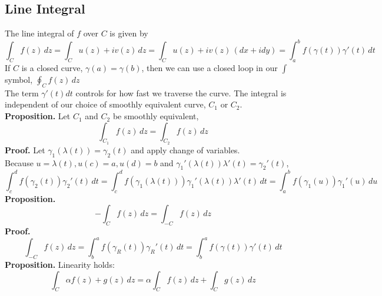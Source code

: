 \documentclass[11pt]{article}
\begin{document}
\subsection{Line Integral}
The line integral of $f$ over $C$ is given by 
$$\int_C f(z) \,dz = \int_C u(z) + iv(z) \,dz = \int_C u(z) + iv(z) \,{(dx + idy)} = \int_{a}^{b} f(\gamma(t))\gamma'(t) \,dt$$
If $C$ is a closed curve, $\gamma(a) = \gamma(b)$, then we can use a closed loop in our $\int$ symbol, $\oint_C f(z) \,dz$ \\
The term $\gamma'(t)dt$ controls for how fast we traverse the curve. The integral is independent of our choice of smoothly equivalent curve, $C_1$ or $C_2$. \\
\newline
\textbf{Proposition.} Let $C_1$ and $C_2$ be smoothly equivalent, \\
$$\int_{C_1} f(z) \,dz = \int_{C_2} f(z) \,dz$$
\textbf{Proof.} Let $\gamma_1(\lambda(t)) = \gamma_2(t)$ and apply change of variables. \\
Because $u = \lambda(t), u(c) = a, u(d) = b$ and $\gamma_1'(\lambda(t))\lambda'(t) = \gamma_2'(t)$, 
$$\int_{c}^{d} f(\gamma_2(t))\gamma_2'(t)\,dt = \int_{c}^{d}f(\gamma_1(\lambda(t)))\gamma_1'(\lambda(t))\lambda'(t)\,dt = \int_{a}^{b}f(\gamma_1(u))\gamma_1'(u)\,du$$
\textbf{Proposition.} 
$$-\int_{C} f(z) \,dz = \int_{-C} f(z) \,dz$$
\textbf{Proof.}
$$\int_{-C} f(z) \,dz = \int_{b}^{a}f(\gamma_R(t))\gamma_R'(t) \,dt = \int_{b}^{a}f(\gamma(t))\gamma'(t) \,dt$$
\newline
\textbf{Proposition.} Linearity holds: 
$$\int_C \alpha f(z) + g(z) \,dz = \alpha \int_C f(z) \,dz + \int_C g(z) \,dz$$
\end{document}
